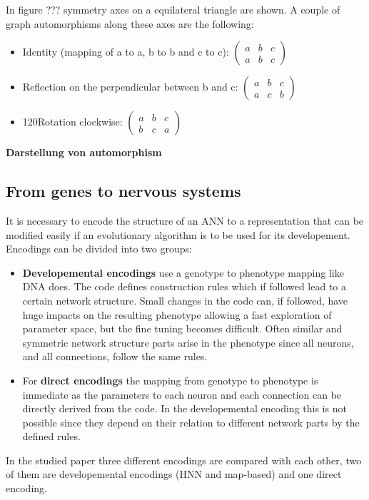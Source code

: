 \documentclass[12pt,twoside]{article}
\theoremstyle{plain}
\theoremstyle{definition}
\theoremstyle{remark}
\begin{document}
In figure ??? symmetry axes on a equilateral triangle are shown. A couple of graph automorphisms along these axes are the following:
\begin{itemize}
	\item Identity (mapping of a to a, b to b and c to c):
	$
	\begin{pmatrix}
	a & b & c \\
	a & b & c
	\end{pmatrix}
	$
	\item Reflection on the perpendicular between b and c:
	$
	\begin{pmatrix}
	a & b & c \\
	a & c & b
	\end{pmatrix}
	$
	\item 120\degree Rotation clockwise:
	$
	\begin{pmatrix}
	a & b & c \\
	b & c & a
	\end{pmatrix}
	$
\end{itemize} 

\textbf{Darstellung von automorphism}

\subsection{From genes to nervous systems}
\label{genes_nervous}
It is necessary to encode the structure of an ANN to a representation that can be modified easily if an evolutionary algorithm is to be used for its developement.
Encodings can be divided into two groups:
\begin{itemize}
	\item \textbf{Developemental encodings} use a genotype to phenotype mapping like DNA does. The code defines construction rules which if followed lead to a certain network structure. Small changes in the code can, if followed, have huge impacts on the resulting phenotype allowing a fast exploration of parameter space, but the fine tuning becomes difficult.
	Often similar and symmetric network structure parts arise in the phenotype since all neurons, and all connections, follow the same rules.
	\item For \textbf{direct encodings} the mapping from genotype to phenotype is immediate as the parameters to each neuron and each connection can be directly derived from the code. In the developemental encoding this is not possible since they depend on their relation to different network parts by the defined rules.
\end{itemize}
In the studied paper three different encodings are compared with each other, two of them are developemental encodings (HNN and map-based) and one direct encoding.
\end{document}
